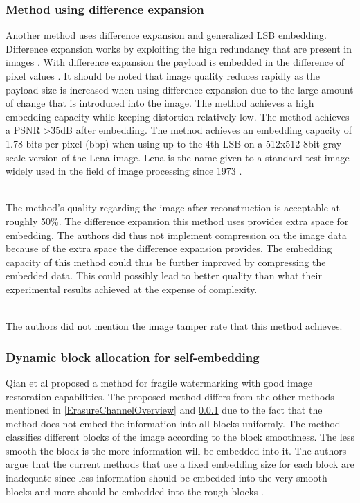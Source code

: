 \documentclass[12pt]{article}
\begin{document}
\subsubsection{Method using difference expansion}
\label{differenceExpansionOverview}
Another method \cite {tian2003high} uses difference expansion and generalized LSB embedding.
Difference expansion works by exploiting the high redundancy that are present in images \cite {tian2002reversible}.
With difference expansion the payload is embedded in the difference of pixel values \cite {tian2002reversible}. 
It should be noted that image quality reduces rapidly as the payload size is increased when using difference expansion due to the large amount of change that is introduced into the image. 
The method achieves a high embedding capacity while keeping distortion relatively low.
The method achieves a PSNR \textgreater 35dB after embedding.
The method achieves an embedding capacity of 1.78 bits per pixel (bbp) when using up to the 4th LSB on a 512x512 8bit gray-scale version of the Lena image. Lena is the name given to a standard test image widely used in the field of image processing since 1973 \cite{lenaOnlineArticle}.

\hspace{0pt} \\
The method's \cite {tian2003high} quality regarding the image after reconstruction is acceptable at roughly 50\%. 
The difference expansion this method uses provides extra space for embedding.
The authors did thus not implement compression on the image data because of the extra space the difference expansion provides.
The embedding capacity of this method could thus be further improved by compressing the embedded data. 
This could possibly lead to better quality than what their experimental results achieved at the expense of complexity.

\hspace{0pt} \\ 
The authors did not mention the image tamper rate that this method \cite {tian2003high} achieves.

\subsubsection{Dynamic block allocation for self-embedding}
\label{DynamicBlockOverview}
Qian et al \cite{qian2011image} proposed a method for fragile watermarking with good image restoration capabilities.
The proposed method differs from the other methods mentioned in \ref{ErasureChannelOverview} and \ref{differenceExpansionOverview} due to the fact that the method does not embed the information into all blocks uniformly.
The method classifies different blocks of the image according to the block smoothness.
The less smooth the block is the more information will be embedded into it.
The authors argue that the current methods that use a fixed embedding size for each block are inadequate since less information should be embedded into the very smooth blocks and more should be embedded into the rough blocks \cite{qian2011image}.
\end{document}
